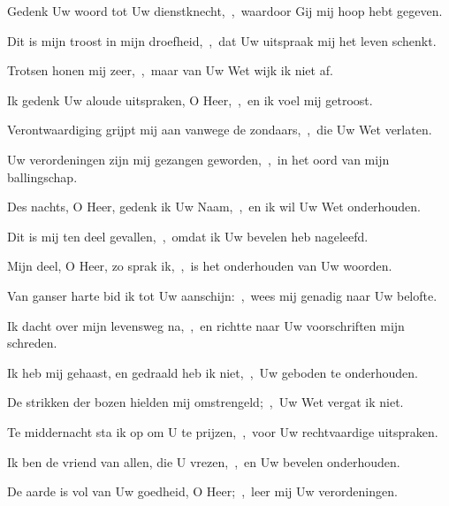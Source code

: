 \documentclass[12pt,twoside,a5paper]{article}
\begin{document}
\begin{halfparskip}
   Gedenk Uw woord tot Uw dienstknecht,~\sep\ waardoor Gij mij hoop hebt gegeven.


  Dit is mijn troost in mijn droefheid,~\sep\ dat Uw uitspraak mij het leven schenkt.

  Trotsen honen mij zeer,~\sep\ maar van Uw Wet wijk ik niet af.

  Ik gedenk Uw aloude uitspraken, O Heer,~\sep\ en ik voel mij getroost.

  Verontwaardiging grijpt mij aan vanwege de zondaars,~\sep\ die Uw Wet verlaten.

  Uw verordeningen zijn mij gezangen geworden,~\sep\ in het oord van mijn ballingschap.

  Des nachts, O Heer, gedenk ik Uw Naam,~\sep\ en ik wil Uw Wet onderhouden.

  Dit is mij ten deel gevallen,~\sep\ omdat ik Uw bevelen heb nageleefd.
\end{halfparskip}

\begin{halfparskip}
   Mijn deel, O Heer, zo sprak ik,~\sep\ is het onderhouden van Uw woorden.


  Van ganser harte bid ik tot Uw aanschijn:~\sep\ wees mij genadig naar Uw belofte.

  Ik dacht over mijn levensweg na,~\sep\ en richtte naar Uw voorschriften mijn schreden.

  Ik heb mij gehaast, en gedraald heb ik niet,~\sep\ Uw geboden te onderhouden.

  De strikken der bozen hielden mij omstrengeld;~\sep\ Uw Wet vergat ik niet.

  Te middernacht sta ik op om U te prijzen,~\sep\ voor Uw rechtvaardige uitspraken.

  Ik ben de vriend van allen, die U vrezen,~\sep\ en Uw bevelen onderhouden.

  De aarde is vol van Uw goedheid, O Heer;~\sep\ leer mij Uw verordeningen.
\end{halfparskip}
\end{document}
